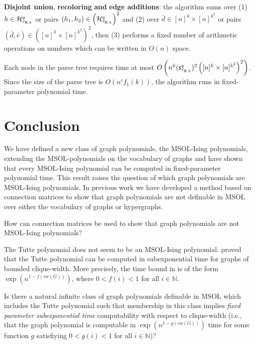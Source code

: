 \documentclass{llncs}
\newcommand{\MSOL}{\mathrm{MSOL}}
\begin{document}
\textbf{Disjoint union},\textbf{ recoloring} \textbf{and} \textbf{edge
additions}: the algorithm sums over (1) $h\in\mathcal{H}_{\tau_{{\bf S},k}}^{q}$
or pairs $(h_{1},h_{2})\in\left(\mathcal{H}_{\tau_{{\bf S},k}}^{q}\right)^{2}$
and (2) over $\bar{d}\in[n]^{k}\times[n]^{k^2}$ or pairs
$(\bar{d},\bar{e})\in\left([n]^{k}\times[n]^{k^2}\right)^{2}$,
then (3) performs a fixed number of arithmetic operations on numbers
which can be written in $O(n)$ space. 

Each node in the parse tree requires time at most $O\left(n^{k}(\mathsf{s}_{\tau_{{\bf S},k}}^{q})^{2}\left([n]^{k}\times[n]^{k^2}\right)^{2}\right)$.
Since the size of the parse tree is $O(n^{c}f_{1}(k))$, the algorithm
runs in fixed-parameter polynomial time. 


\section{Conclusion}

We have defined a new class of graph polynomials, the $\MSOL$-Ising
polynomials, extending the $\MSOL$-polynomials on the vocabulary
of graphs and have shown that every $\MSOL$-Ising polynomial can
be computed in fixed-parameter polynomial time. This result raises
the question of which graph polynomials are $\MSOL$-Ising polynomials.
In previous work \cite{pr:GKM08,pr:Makowsky09icla,ar:KM14connection}
we have developed a method based on connection matrices to show that graph
polynomials are not definable in $\MSOL$ over either the vocabulary
of graphs or hypergraphs. 
\begin{problem}
How can connection matrices be used to show that graph polynomials
are not $\MSOL$-Ising polynomials?
\end{problem}
The Tutte polynomial does not seem to be an $\MSOL$-Ising polynomial.
\cite{gimenez2006computing} proved that the Tutte polynomial can
be computed in subexponential time for graphs of bounded clique-width. 
More precisely, the time bound in \cite{gimenez2006computing}
is of the form
$\exp(n^{1-f(cw(G))})$, where $0<f(i)<1$ for all $i\in \mathbb{N}$. 
\begin{problem}
Is there a natural infinite class of graph polynomials definable in
$\MSOL$ which includes the Tutte polynomial such that membership
in this class implies {\em fixed parameter subexponential time} computability
with respect to clique-width
(i.e., that the graph polynomial is computable in $\exp(n^{1-g(cw(G))})$
time for some function $g$ satisfiying $0<g(i)<1$ for all $i\in \mathbb{N}$)?
\end{problem}
\end{document}
